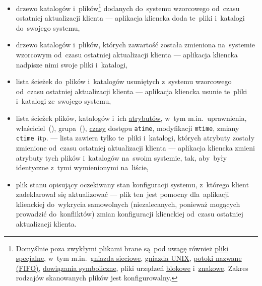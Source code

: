 \documentclass[thesis]{subfiles}
\begin{document}
\begin{itemize}
	\item drzewo katalogów i~plików\footnote{Domyślnie poza zwykłymi plikami brane są~pod uwagę również \href{https://en.wikipedia.org/wiki/Unix_file_types}{pliki specjalne}, w~tym m.in.~\href{https://en.wikipedia.org/wiki/Network_socket}{gniazda sieciowe}, \href{https://en.wikipedia.org/wiki/Unix_domain_socket}{gniazda UNIX}, \href{https://en.wikipedia.org/wiki/Named_pipe}{potoki nazwane (FIFO)}, \href{https://en.wikipedia.org/wiki/Symbolic_link}{dowiązania symboliczne}, pliki urządzeń \href{https://en.wikipedia.org/wiki/Device_file\#Block_devices}{blokowe} i~\href{https://en.wikipedia.org/wiki/Device_file\#Character_devices}{znakowe}. Zakres rodzajów skanowanych plików jest konfigurowalny.} dodanych do~systemu wzorcowego od~czasu ostatniej aktualizacji klienta --- aplikacja kliencka doda te~pliki i~katalogi do~swojego systemu,
	\item drzewo katalogów i~plików, których zawartość została zmieniona na~systemie wzorcowym od~czasu ostatniej aktualizacji klienta --- aplikacja kliencka nadpisze nimi swoje pliki i~katalogi,
	\item lista ścieżek do~plików i~katalogów usuniętych z~systemu wzorcowego od~czasu ostatniej aktualizacji klienta --- aplikacja kliencka usunie te~pliki i~katalogi ze~swojego systemu,
	\item lista ścieżek plików, katalogów i~ich \href{https://serverfault.com/a/584102/289017}{atrybutów}, w~tym m.in.~uprawnienia, właściciel~(), grupa~(), \href{http://leksykot.top.hell.pl/lx3/N/atime_mtime_ctime}{czasy} dostępu \texttt{atime}, modyfikacji \texttt{mtime}, zmiany \texttt{ctime}~itp. --- lista zawiera tylko te~pliki i~katalogi, których atrybuty zostały zmienione od~czasu ostatniej aktualizacji klienta --- aplikacja kliencka zmieni atrybuty tych plików i~katalogów na~swoim systemie, tak, aby~były identyczne z~tymi wymienionymi na~liście,
	\item plik stanu opisujący oczekiwany stan konfiguracji systemu, z~którego klient zadeklarował się aktualizować --- plik ten~jest pomocny dla~aplikacji klienckiej do~wykrycia samowolnych (niezalecanych, ponieważ mogących prowadzić do~konfliktów) zmian konfiguracji klienckiej od~czasu ostatniej aktualizacji klienta.
\end{itemize}
\end{document}
